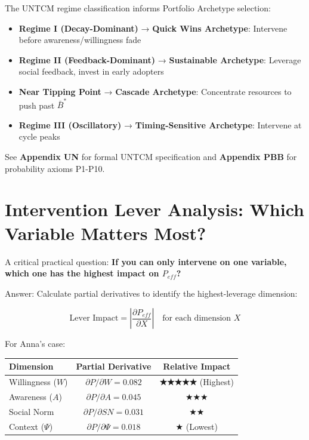 \begin{tcolorbox}[colback=orange!5!white, colframe=orange!75!black, title=UNTCM Connection to Portfolio Archetypes (Chapter 20)]
The UNTCM regime classification informs Portfolio Archetype selection:
\begin{itemize}[nosep]
\item \textbf{Regime I (Decay-Dominant)} → \textbf{Quick Wins Archetype}: Intervene before awareness/willingness fade
\item \textbf{Regime II (Feedback-Dominant)} → \textbf{Sustainable Archetype}: Leverage social feedback, invest in early adopters
\item \textbf{Near Tipping Point} → \textbf{Cascade Archetype}: Concentrate resources to push past $\bar{B}^*$
\item \textbf{Regime III (Oscillatory)} → \textbf{Timing-Sensitive Archetype}: Intervene at cycle peaks
\end{itemize}
See \textbf{Appendix UN} for formal UNTCM specification and \textbf{Appendix PBB} for probability axioms P1-P10.
\end{tcolorbox}

\section{Intervention Lever Analysis: Which Variable Matters Most?}\label{sec:ch16-levers}

A critical practical question: \textbf{If you can only intervene on one variable, which one has the highest impact on $P_{eff}$?}

Answer: Calculate partial derivatives to identify the highest-leverage dimension:

\begin{equation}
\text{Lever Impact} = \left| \frac{\partial P_{eff}}{\partial X} \right| \quad \text{for each dimension } X
\end{equation}

For Anna's case:

\begin{center}
\begin{tabular}{|l|c|c|}
\hline
\textbf{Dimension} & \textbf{Partial Derivative} & \textbf{Relative Impact} \\
\hline
Willingness ($W$) & $\partial P / \partial W = 0.082$ & \textbf{★★★★★} (Highest) \\
\hline
Awareness ($A$) & $\partial P / \partial A = 0.045$ & ★★★ \\
\hline
Social Norm & $\partial P / \partial SN = 0.031$ & ★★ \\
\hline
Context ($\Psi$) & $\partial P / \partial \Psi = 0.018$ & ★ (Lowest) \\
\hline
\end{tabular}
\end{center}

